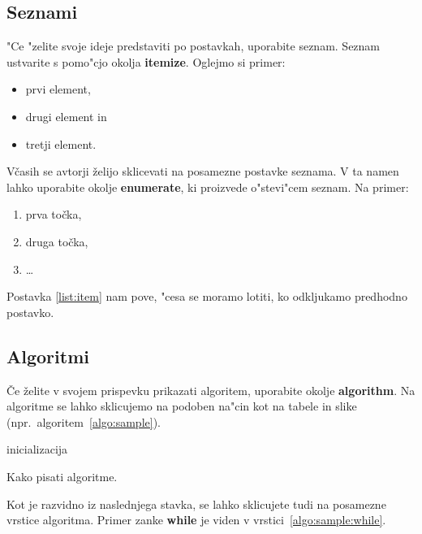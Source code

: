 \documentclass[sigconf,nonacm]{acmart}
\begin{document}
\subsection{Seznami}

"Ce "zelite svoje ideje predstaviti po postavkah, uporabite seznam.  Seznam
ustvarite s pomo"cjo okolja \textbf{itemize}.  Oglejmo si primer:

\begin{itemize}
    \item prvi element,
    \item drugi element in
    \item tretji element.
\end{itemize}

Včasih se avtorji želijo sklicevati na posamezne postavke seznama.  V ta namen
lahko uporabite okolje \textbf{enumerate}, ki proizvede o"stevi"cem seznam.
Na primer:

\begin{enumerate}
    \item prva točka,
    \item\label{list:item} druga točka,
    \item \ldots
\end{enumerate}

Postavka \ref{list:item} nam pove, "cesa se moramo lotiti, ko odkljukamo
predhodno postavko.

\subsection{Algoritmi}

Če želite v svojem prispevku prikazati algoritem, uporabite okolje
\textbf{algorithm}.  Na algoritme se lahko sklicujemo na podoben na"cin kot na
tabele in slike (npr.\ algoritem~\ref{algo:sample}).

\begin{algorithm}
    \SetAlgoLined
    inicializacija\;
    \caption{Kako pisati algoritme.}
    \label{algo:sample}
\end{algorithm}

Kot je razvidno iz naslednjega stavka, se lahko sklicujete tudi na posamezne
vrstice algoritma.  Primer zanke \textbf{while} je viden v
vrstici~\ref{algo:sample:while}.
\end{document}
